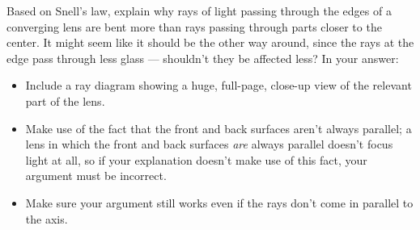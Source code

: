 Based on Snell's law, explain why rays of light passing
through the edges of a converging lens are bent more than
rays passing through parts closer to the center. It might
seem like it should be the other way around, since the rays
at the edge pass through less glass --- shouldn't
they be affected less? In your answer:
\begin{itemize}
\item Include a ray diagram showing a huge, full-page, close-up view of the relevant part of the
lens.
\item Make use of the fact that the front and back surfaces aren't always parallel; a lens in
which the front and back surfaces \emph{are} always parallel doesn't focus light at all, so
if your explanation doesn't make use of this fact, your argument must be incorrect.
\item Make sure your argument still works even if the rays don't come in parallel to
the axis.
\end{itemize}
